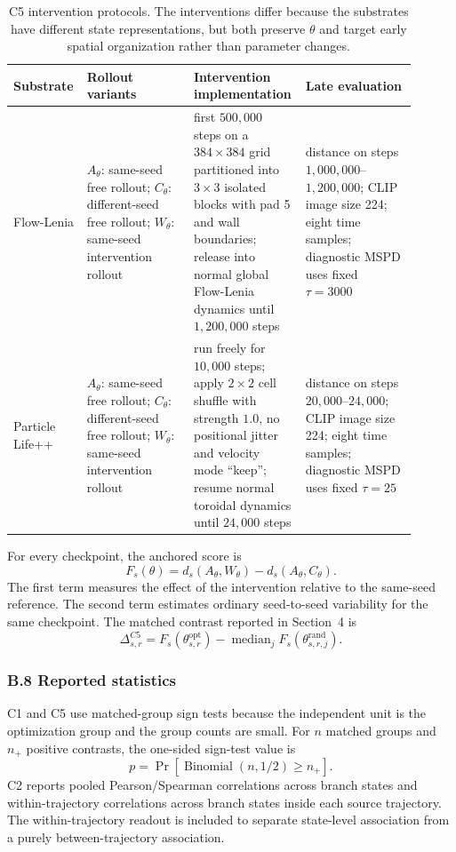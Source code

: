 \begin{table}[H]
\centering
\scriptsize
\begin{tabular}{p{0.14\linewidth}p{0.26\linewidth}p{0.23\linewidth}p{0.27\linewidth}}
\toprule
Substrate & Rollout variants & Intervention implementation & Late evaluation \\
\midrule
Flow-Lenia & $A_\theta$: same-seed free rollout; $C_\theta$: different-seed free rollout; $W_\theta$: same-seed intervention rollout & first $500{,}000$ steps on a $384\times384$ grid partitioned into $3\times3$ isolated blocks with pad 5 and wall boundaries; release into normal global Flow-Lenia dynamics until $1{,}200{,}000$ steps & distance on steps $1{,}000{,}000$--$1{,}200{,}000$; CLIP image size 224; eight time samples; diagnostic MSPD uses fixed $\tau=3000$ \\
Particle Life++ & $A_\theta$: same-seed free rollout; $C_\theta$: different-seed free rollout; $W_\theta$: same-seed intervention rollout & run freely for $10{,}000$ steps; apply $2\times2$ cell shuffle with strength $1.0$, no positional jitter and velocity mode ``keep''; resume normal toroidal dynamics until $24{,}000$ steps & distance on steps $20{,}000$--$24{,}000$; CLIP image size 224; eight time samples; diagnostic MSPD uses fixed $\tau=25$ \\
\bottomrule
\end{tabular}
\caption{C5 intervention protocols.  The interventions differ because the substrates have different state representations, but both preserve $\theta$ and target early spatial organization rather than parameter changes.}
\label{tab:c5-protocols}
\end{table}
\FloatBarrier

For every checkpoint, the anchored score is
\[
  F_s(\theta)=d_s(A_\theta,W_\theta)-d_s(A_\theta,C_\theta).
\]
The first term measures the effect of the intervention relative to the same-seed reference.  The second term estimates ordinary seed-to-seed variability for the same checkpoint.  The matched contrast reported in Section~4 is
\[
  \Delta^{C5}_{s,r}=F_s(\theta^{\mathrm{opt}}_{s,r})-
  \operatorname{median}_{j}F_s(\theta^{\mathrm{rand}}_{s,r,j}).
\]

\subsubsection*{B.8 Reported statistics}

C1 and C5 use matched-group sign tests because the independent unit is the optimization group and the group counts are small.  For $n$ matched groups and $n_+$ positive contrasts, the one-sided sign-test value is
\[
  p=\Pr[\operatorname{Binomial}(n,1/2)\ge n_+].
\]
C2 reports pooled Pearson/Spearman correlations across branch states and within-trajectory correlations across branch states inside each source trajectory.  The within-trajectory readout is included to separate state-level association from a purely between-trajectory association.


